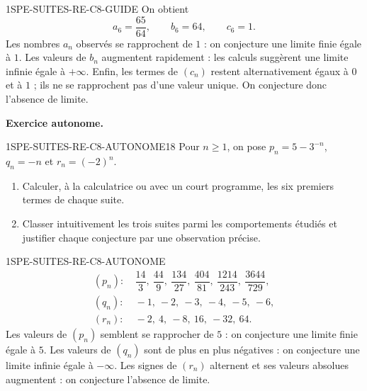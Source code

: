 \begin{corrige}{1SPE-SUITES-RE-C8-GUIDE}
On obtient
\[
a_6=\dfrac{65}{64},\qquad b_6=64,\qquad c_6=1.
\]
Les nombres $a_n$ observés se rapprochent de $1$ : on conjecture une limite
finie égale à $1$. Les valeurs de $b_n$ augmentent rapidement : les calculs
suggèrent une limite infinie égale à $+\infty$. Enfin, les termes de $(c_n)$
restent alternativement égaux à $0$ et à $1$ ; ils ne se rapprochent pas
d'une valeur unique. On conjecture donc l'absence de limite.
\end{corrige}

\textbf{Exercice autonome.}
\begin{exercice}{1SPE-SUITES-RE-C8-AUTONOME}{1}{8}
Pour $n\geqslant 1$, on pose $p_n=5-3^{-n}$, $q_n=-n$ et
$r_n=(-2)^n$.
\begin{enumerate}
  \item Calculer, à la calculatrice ou avec un court programme, les six
  premiers termes de chaque suite.
  \item Classer intuitivement les trois suites parmi les comportements
  étudiés et justifier chaque conjecture par une observation précise.
\end{enumerate}
\end{exercice}


\begin{corrige}{1SPE-SUITES-RE-C8-AUTONOME}
\[
\begin{aligned}
(p_n) :&\ \dfrac{14}{3},\ \dfrac{44}{9},\ \dfrac{134}{27},\ \dfrac{404}{81},\ \dfrac{1214}{243},\ \dfrac{3644}{729},\\
(q_n) :&\ -1,\ -2,\ -3,\ -4,\ -5,\ -6,\\
(r_n) :&\ -2,\ 4,\ -8,\ 16,\ -32,\ 64.
\end{aligned}
\]
Les valeurs de $(p_n)$ semblent se rapprocher de $5$ : on conjecture une
limite finie égale à $5$. Les valeurs de $(q_n)$ sont de plus en plus
négatives : on conjecture une limite infinie égale à $-\infty$. Les signes de
$(r_n)$ alternent et ses valeurs absolues augmentent : on conjecture l'absence
de limite.
\end{corrige}

